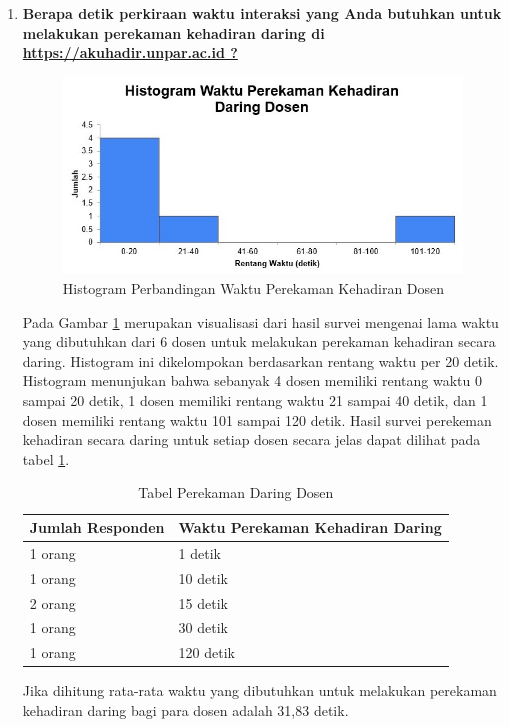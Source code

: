 \documentclass[a4paper,twoside]{article}
\begin{document}
\begin{enumerate}
		\begin{enumerate}
			\item \textbf{Berapa detik perkiraan waktu interaksi yang Anda butuhkan untuk melakukan perekaman kehadiran daring di \url{https://akuhadir.unpar.ac.id ?}}
			\begin{figure}[H]
				\centering
				\includegraphics[scale=0.8]{Gambar/daringDosen.jpg}
				\caption{Histogram Perbandingan Waktu Perekaman Kehadiran Dosen} 
				\label{fig:daringDosen}
			\end{figure}
			Pada Gambar \ref{fig:daringDosen} merupakan visualisasi dari hasil survei mengenai lama waktu yang dibutuhkan dari 6 dosen untuk melakukan perekaman kehadiran secara daring. Histogram ini dikelompokan berdasarkan rentang waktu per 20 detik. Histogram menunjukan bahwa sebanyak 4 dosen memiliki rentang waktu 0 sampai 20 detik, 1 dosen memiliki rentang waktu 21 sampai 40 detik, dan 1 dosen memiliki rentang waktu 101 sampai 120 detik. Hasil survei perekeman kehadiran secara daring untuk setiap dosen secara jelas dapat dilihat pada tabel \ref{tab:daringDosen}.
			\begin{table}[ht]			
				\caption{Tabel Perekaman Daring Dosen}
				\centering
				\begin{tabular}{|p{4cm} |p{7cm}|}\hline
					Jumlah Responden &  Waktu Perekaman Kehadiran Daring \\ \hline     
					1 orang &  1 detik\\ \hline 
					1 orang &  10 detik\\ \hline 
					2 orang &  15 detik\\ \hline 
					1 orang &  30 detik\\ \hline 
					1 orang &  120 detik\\ \hline 
				\end{tabular}
				\label{tab:daringDosen}
			\end{table}
			\newpage
			Jika dihitung rata-rata waktu yang dibutuhkan untuk melakukan perekaman kehadiran daring bagi para dosen adalah 31,83 detik.
		

\end{enumerate}
\end{enumerate}
\end{document}
